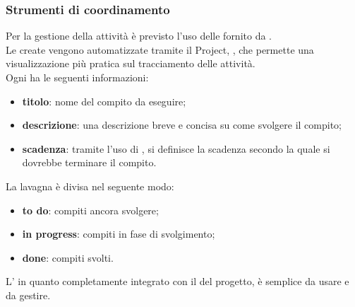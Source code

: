 		 \subsubsection{Strumenti di coordinamento}
		 Per la gestione della attività è previsto l'uso delle  fornito da . \\
		 Le  create vengono automatizzate tramite il Project, , che permette una visualizzazione più pratica sul tracciamento delle attività. \\
		 Ogni  ha le seguenti informazioni:
		 \begin{itemize}
		 	\item {\bfseries titolo}: nome del compito da eseguire;
		 	\item {\bfseries descrizione}: una descrizione breve e concisa su come svolgere il compito;
		 	\item {\bfseries scadenza}: tramite l'uso di , si definisce la scadenza secondo la quale si dovrebbe terminare il compito.
		 \end{itemize}
		 La lavagna è divisa nel seguente modo:
		 \begin{itemize}
		 	\item {\bfseries to do}: compiti ancora svolgere;
		 	\item {\bfseries in progress}: compiti in fase di svolgimento;
		 	\item {\bfseries done}: compiti svolti.
		 	\end{itemize}
	 	L' in quanto completamente integrato con il  del progetto, è semplice da usare e da gestire.
